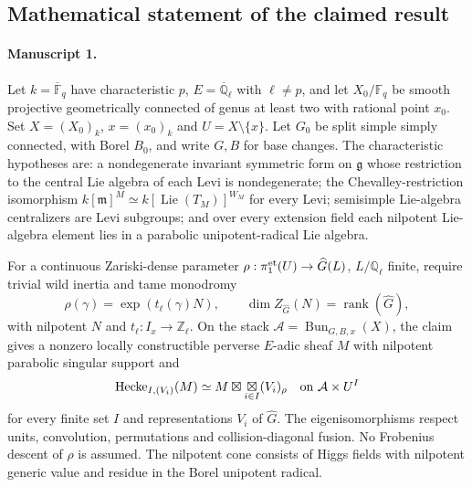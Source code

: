 \documentclass[11pt]{article}
\begin{document}
\subsection{Mathematical statement of the claimed result}
\paragraph{Manuscript 1.}
Let $k=\overline{\mathbb F}_q$ have characteristic $p$, $E=\overline{\mathbb Q}_{\ell}$ with $\ell\ne p$, and let $X_0/\mathbb F_q$ be smooth projective geometrically connected of genus at least two with rational point $x_0$. Set $X=(X_0)_k$, $x=(x_0)_k$ and $U=X\setminus\{x\}$. Let $G_0$ be split simple simply connected, with Borel $B_0$, and write $G,B$ for base changes. The characteristic hypotheses are: a nondegenerate invariant symmetric form on $\mathfrak g$ whose restriction to the central Lie algebra of each Levi is nondegenerate; the Chevalley-restriction isomorphism $k[\mathfrak m]^M\simeq k[\operatorname{Lie}(T_M)]^{W_M}$ for every Levi; semisimple Lie-algebra centralizers are Levi subgroups; and over every extension field each nilpotent Lie-algebra element lies in a parabolic unipotent-radical Lie algebra.

For a continuous Zariski-dense parameter $\rho:\pi_1^{\rm et}(U)\to\widehat G(L)$, $L/\mathbb Q_{\ell}$ finite, require trivial wild inertia and tame monodromy
\[
 \rho(\gamma)=\exp(t_{\ell}(\gamma)N),\qquad
 \dim Z_{\widehat G}(N)=\operatorname{rank}(\widehat G),
\]
with nilpotent $N$ and $t_{\ell}:I_x\to\mathbb Z_{\ell}$. On the stack $\mathcal A=\operatorname{Bun}_{G,B,x}(X)$, the claim gives a nonzero locally constructible perverse $E$-adic sheaf $M$ with nilpotent parabolic singular support and
\[
 \operatorname{Hecke}_{I,(V_i)}(M)\simeq
 M\boxtimes\mathop{\boxtimes}_{i\in I}(V_i)_{\rho}
 \quad\hbox{on }\mathcal A\times U^I
\]
for every finite set $I$ and representations $V_i$ of $\widehat G$. The eigenisomorphisms respect units, convolution, permutations and collision-diagonal fusion. No Frobenius descent of $\rho$ is assumed. The nilpotent cone consists of Higgs fields with nilpotent generic value and residue in the Borel unipotent radical.
\end{document}
